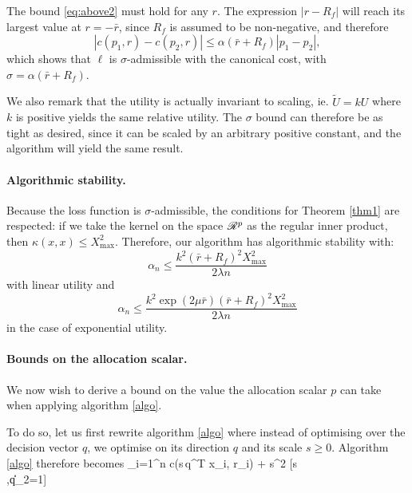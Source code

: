 The bound \eqref{eq:above2} must hold for any $r$. The expression $|r-R_f|$ will reach
its largest value at $r=-\bar r$, since $R_f$ is assumed to be non-negative, and therefore
\begin{equation*} 
  |c(p_1,r) - c(p_2,r)| \leq \alpha (\bar r + R_f)|p_1-p_2|,
\end{equation*} 
which shows that $\ell$ is $\sigma$-admissible with the canonical cost,
with $\sigma=\alpha(\bar r+ R_f)$.

We also remark that the utility is actually invariant to scaling, ie. $\tilde{U} = kU$
where $k$ is positive yields the same relative utility. The $\sigma$ bound can therefore
be as tight as desired, since it can be scaled by an arbitrary positive constant, and the
algorithm will yield the same result.

\paragraph{Algorithmic stability.}
Because the loss function is $\sigma$-admissible, the conditions for Theorem \ref{thm1}
are respected: if we take the kernel on the space $\mathscr{R}^p$ as the regular inner product,
then $\kappa(x,x)\leq X^2_{\max}$. Therefore, our algorithm has algorithmic stability
with:
\begin{equation}
  \label{algoStabilityLinear}
  \alpha_n \leq \frac{k^2(\bar r+R_f)^2X^2_{\max}}{2\lambda n}
\end{equation}
 with linear utility and
\begin{equation*}
   \alpha_n \leq \frac{k^2 \exp(2\mu\bar r)(\bar r + R_f)^2 X^2_{\max}}{2\lambda n}
\end{equation*}
in the case of exponential utility.


\paragraph{Bounds on the allocation scalar.}
We now wish to derive a bound on the value the allocation scalar $p$ can take when
applying algorithm \eqref{algo}.

To do so, let us first rewrite algorithm \eqref{algo} where instead of optimising over the
decision vector $q$, we optimise on its direction $q$ and its scale $s\geq0$. Algorithm
\eqref{algo} therefore becomes \minimizeEquation%
{\sum_{i=1}^n c(s\,q^T x_i, r_i) + \lambda s^2}%
[s\\,\|q\|_2=1]


